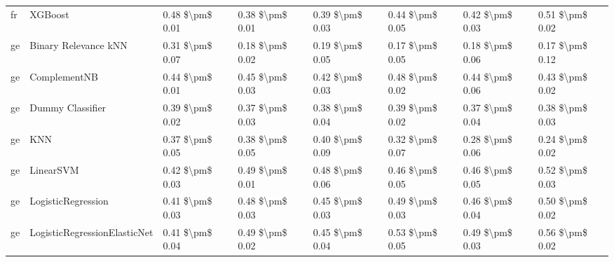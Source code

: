 \begin{tabular}{llllllll}
      fr &                         XGBoost & 0.48 \$\textbackslash pm\$ 0.01 &           0.38 \$\textbackslash pm\$ 0.01 &       0.39 \$\textbackslash pm\$ 0.03 &        0.44 \$\textbackslash pm\$ 0.05 &                         0.42 \$\textbackslash pm\$ 0.03 &     0.51 \$\textbackslash pm\$ 0.02 \\
      ge &            Binary Relevance kNN & 0.31 \$\textbackslash pm\$ 0.07 &           0.18 \$\textbackslash pm\$ 0.02 &       0.19 \$\textbackslash pm\$ 0.05 &        0.17 \$\textbackslash pm\$ 0.05 &                         0.18 \$\textbackslash pm\$ 0.06 &     0.17 \$\textbackslash pm\$ 0.12 \\
      ge &                    ComplementNB & 0.44 \$\textbackslash pm\$ 0.01 &           0.45 \$\textbackslash pm\$ 0.03 &       0.42 \$\textbackslash pm\$ 0.03 &        0.48 \$\textbackslash pm\$ 0.02 &                         0.44 \$\textbackslash pm\$ 0.06 &     0.43 \$\textbackslash pm\$ 0.02 \\
      ge &                Dummy Classifier & 0.39 \$\textbackslash pm\$ 0.02 &           0.37 \$\textbackslash pm\$ 0.03 &       0.38 \$\textbackslash pm\$ 0.04 &        0.39 \$\textbackslash pm\$ 0.02 &                         0.37 \$\textbackslash pm\$ 0.04 &     0.38 \$\textbackslash pm\$ 0.03 \\
      ge &                             KNN & 0.37 \$\textbackslash pm\$ 0.05 &           0.38 \$\textbackslash pm\$ 0.05 &       0.40 \$\textbackslash pm\$ 0.09 &        0.32 \$\textbackslash pm\$ 0.07 &                         0.28 \$\textbackslash pm\$ 0.06 &     0.24 \$\textbackslash pm\$ 0.02 \\
      ge &                       LinearSVM & 0.42 \$\textbackslash pm\$ 0.03 &           0.49 \$\textbackslash pm\$ 0.01 &       0.48 \$\textbackslash pm\$ 0.06 &        0.46 \$\textbackslash pm\$ 0.05 &                         0.46 \$\textbackslash pm\$ 0.05 &     0.52 \$\textbackslash pm\$ 0.03 \\
      ge &              LogisticRegression & 0.41 \$\textbackslash pm\$ 0.03 &           0.48 \$\textbackslash pm\$ 0.03 &       0.45 \$\textbackslash pm\$ 0.03 &        0.49 \$\textbackslash pm\$ 0.03 &                         0.46 \$\textbackslash pm\$ 0.04 &     0.50 \$\textbackslash pm\$ 0.02 \\
      ge &    LogisticRegressionElasticNet & 0.41 \$\textbackslash pm\$ 0.04 &           0.49 \$\textbackslash pm\$ 0.02 &       0.45 \$\textbackslash pm\$ 0.04 &        0.53 \$\textbackslash pm\$ 0.05 &                         0.49 \$\textbackslash pm\$ 0.03 &     0.56 \$\textbackslash pm\$ 0.02 \\

\end{tabular}
